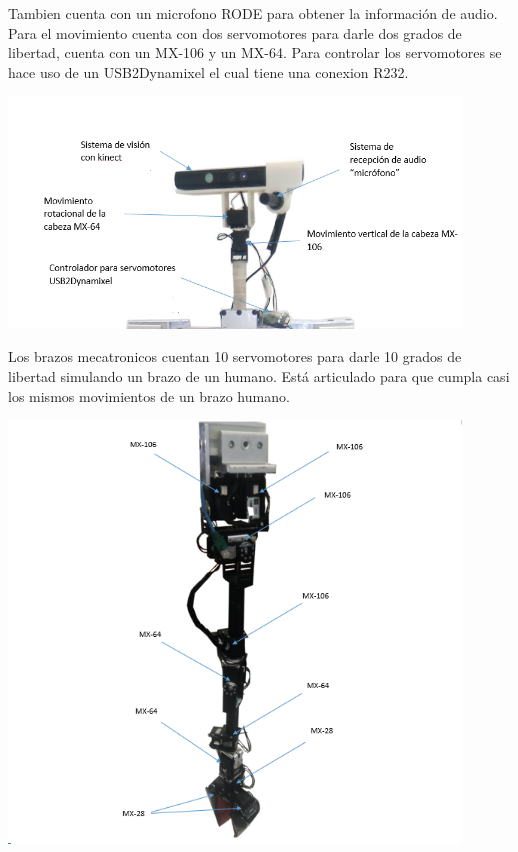 \documentclass[a4paper,usenames,dvipsnames,svgnames,table]{book}
\begin{document}
Tambien cuenta con un microfono RODE para obtener la información de audio. Para el movimiento cuenta con dos servomotores
para darle dos grados de libertad, cuenta con un MX-106 y un MX-64. Para controlar los servomotores se hace uso de un
USB2Dynamixel el cual tiene una conexion R232.

\begin{center}
\includegraphics[width=0.9\textwidth]{Figures/Hardware/Diagramas/Cabeza.png}
\label{fig:Hardware:Diagramas:Justina:Completa}
\end{center}

\newpage
Los brazos mecatronicos cuentan 10 servomotores para darle 10 grados de libertad simulando un brazo de un humano.
Está articulado para que cumpla casi los mismos movimientos de un brazo humano.

\begin{center}
\includegraphics[width=0.9\textwidth]{Figures/Hardware/Diagramas/Brazo.png}
\label{fig:Hardware:Diagramas:Justina:Brazo}
\end{center}
\end{document}

